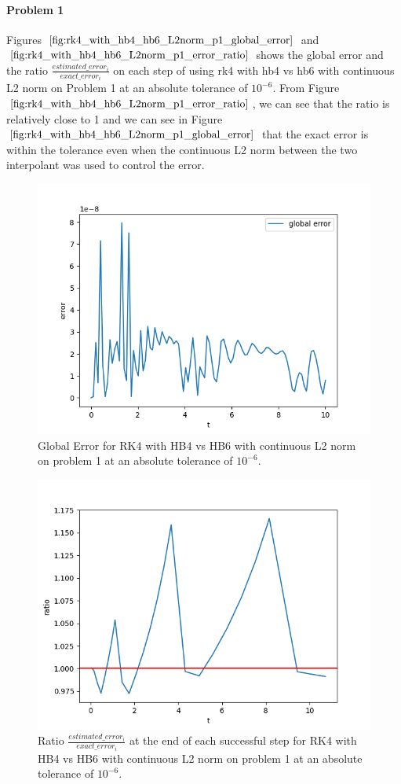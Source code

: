 \paragraph{Problem 1} Figures $\ref{fig:rk4_with_hb4_hb6_L2norm_p1_global_error}$ and $\ref{fig:rk4_with_hb4_hb6_L2norm_p1_error_ratio}$ shows the global error and the ratio $\frac{estimated\_error_i}{exact\_error_i}$ on each step of using rk4 with hb4 vs hb6 with continuous L2 norm on Problem 1 at an absolute tolerance of $10^{-6}$. From Figure $\ref{fig:rk4_with_hb4_hb6_L2norm_p1_error_ratio}$, we can see that the ratio is relatively close to 1 and we can see in Figure  $\ref{fig:rk4_with_hb4_hb6_L2norm_p1_global_error}$ that the exact error is within the tolerance even when the continuous L2 norm between the two interpolant was used to control the error.

\begin{figure}[H]
\centering
\includegraphics[width=0.7\linewidth]{./figures/rk4_with_hb4_hb6_L2norm_p1_global_error}
\caption{Global Error for RK4 with HB4 vs HB6 with continuous L2 norm on problem 1 at an absolute tolerance of $10^{-6}$.}
\label{fig:rk4_with_hb4_hb6_L2norm_p1_global_error}
\end{figure}

\begin{figure}[H]
\centering
\includegraphics[width=0.7\linewidth]{./figures/rk4_with_hb4_hb6_L2norm_p1_error_ratio}
\caption{Ratio $\frac{estimated\_error_i}{exact\_error_i}$ at the end of each successful step for RK4 with HB4 vs HB6 with continuous L2 norm on problem 1 at an absolute tolerance of $10^{-6}$.}
\label{fig:rk4_with_hb4_hb6_L2norm_p1_error_ratio}
\end{figure}

